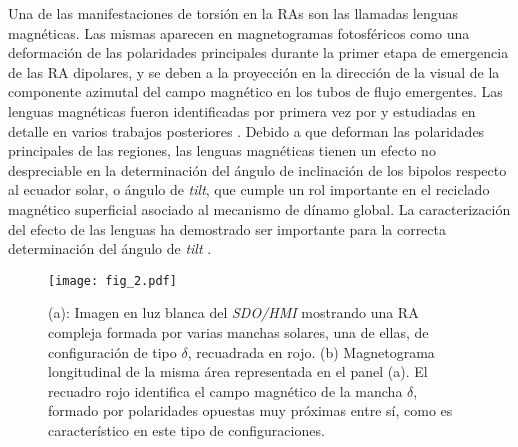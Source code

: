 \documentclass[baaa]{baaa}
\begin{document}
Una de las manifestaciones de torsión en la RAs son las llamadas lenguas magnéticas. Las mismas aparecen en magnetogramas fotosféricos como una deformación de las polaridades principales durante la primer etapa de emergencia de las RA dipolares, y se deben a la proyección en la dirección de la visual de la componente azimutal del campo magnético en los tubos de flujo emergentes. Las lenguas magnéticas fueron identificadas por primera vez por \citet{lopezfuentes2000} y estudiadas en detalle en varios trabajos posteriores \citep{luoni2011,poisson2015}. Debido a que deforman las polaridades principales de las regiones, las lenguas magnéticas tienen un efecto no despreciable en la determinación del ángulo de inclinación de los bipolos respecto al ecuador solar, o ángulo de {\sl tilt}, que cumple un rol importante en el reciclado magnético superficial asociado al mecanismo de dínamo global. La caracterización del efecto de las lenguas ha demostrado ser importante para la correcta determinación del ángulo de {\sl tilt} \citep{poisson2020a}.  

\begin{figure}[!t]
\centering
\texttt{[image: fig\_2.pdf]}
\caption{(a): Imagen en luz blanca del {\sl SDO/HMI} mostrando una RA compleja formada por varias manchas solares, una de ellas, de configuración de tipo $\delta$, recuadrada en rojo. (b) Magnetograma longitudinal de la misma área representada en el panel (a). El recuadro rojo identifica el campo magnético de la mancha $\delta$, formado por polaridades opuestas muy próximas entre sí, como es característico en este tipo de configuraciones.}
\label{fig_2}
\end{figure}
\end{document}
